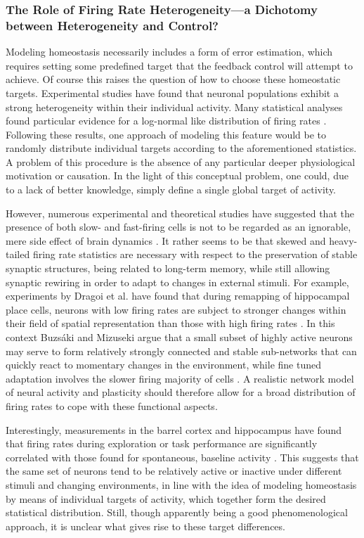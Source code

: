 \documentclass[10pt,a4paper]{article}
\begin{document}
\subsubsection{The Role of Firing Rate Heterogeneity---a Dichotomy between Heterogeneity and Control?}
Modeling homeostasis necessarily includes a form of error estimation, which requires setting some predefined target that the feedback control will attempt to achieve. Of course this raises the question of how to choose these homeostatic targets. Experimental studies have found that neuronal populations exhibit a strong heterogeneity within their individual activity. Many statistical analyses found particular evidence for a log-normal like distribution of firing rates \cite{Buzsaki_Fir_Rates_2014,Wohrer_Fir_Rates_2012}. Following these results, one approach of modeling this feature would be to randomly distribute individual targets according to the aforementioned statistics. A problem of this procedure is the absence of any particular deeper physiological motivation or causation. In the light of this conceptual problem, one could, due to a lack of better knowledge, simply define a single global target of activity.

However, numerous experimental and theoretical studies have suggested that the presence of both slow- and fast-firing cells is not to be regarded as an ignorable, mere side effect of brain dynamics \cite{Buzsaki_2004,Marsat_2010,Tripathy_2013}. It rather seems to be that skewed and heavy-tailed firing rate statistics are necessary with respect to the preservation of stable synaptic structures, being related to long-term memory, while still allowing synaptic rewiring in order to adapt to changes in external stimuli. For example, experiments by Dragoi et al. have found that during remapping of hippocampal place cells, neurons with low firing rates are subject to stronger changes within their field of spatial representation than those with high firing rates \cite{Dragoi_2003}. In this context Buzsáki and Mizuseki argue that a small subset of highly active neurons may serve to form relatively strongly connected and stable sub-networks that can quickly react to momentary changes in the environment, while fine tuned adaptation involves the slower firing majority of cells \cite{Buzsaki_Fir_Rates_2014}. A realistic network model of neural activity and plasticity should therefore allow for a broad distribution of firing rates to cope with these functional aspects. 

Interestingly, measurements in the barrel cortex and hippocampus have found that firing rates during exploration or task performance are significantly correlated with those found for spontaneous, baseline activity \cite{OConnor_2010,Mizuseki_2013}. This suggests that the same set of neurons tend to be relatively active or inactive under different stimuli and changing environments, in line with the idea of modeling homeostasis by means of individual targets of activity, which together form the desired statistical distribution. Still, though apparently being a good phenomenological approach, it is unclear what gives rise to these target differences. 
\end{document}
